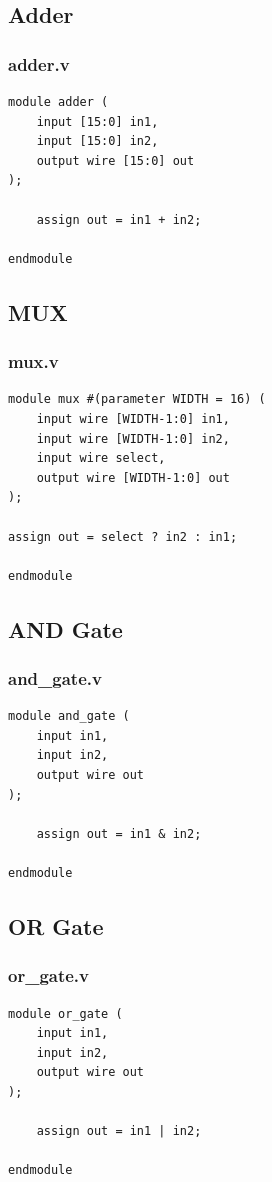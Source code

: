 \documentclass[12pt]{report}
\begin{document}
\subsection{Adder}
\subsubsection{adder.v}
\begin{lstlisting}
module adder (
    input [15:0] in1,
    input [15:0] in2,
    output wire [15:0] out
);

    assign out = in1 + in2;
    
endmodule
\end{lstlisting}

\subsection{MUX}
\subsubsection{mux.v}
\begin{lstlisting}
module mux #(parameter WIDTH = 16) (
    input wire [WIDTH-1:0] in1,
    input wire [WIDTH-1:0] in2,
    input wire select,
    output wire [WIDTH-1:0] out
);

assign out = select ? in2 : in1;
    
endmodule

\end{lstlisting}

\subsection{AND Gate}
\subsubsection{and\_gate.v}
\begin{lstlisting}
module and_gate (
    input in1,
    input in2,
    output wire out
);

    assign out = in1 & in2;
    
endmodule

\end{lstlisting}

\subsection{OR Gate}
\subsubsection{or\_gate.v}
\begin{lstlisting}
module or_gate (
    input in1,
    input in2,
    output wire out
);

    assign out = in1 | in2;
    
endmodule

\end{lstlisting}
\end{document}
